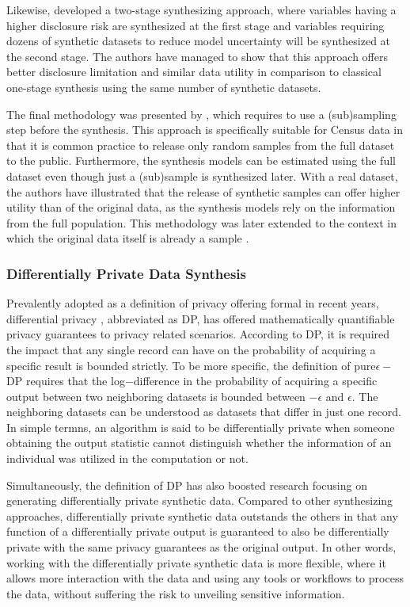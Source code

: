 Likewise, \citet{reiter2010releasing} developed a two-stage synthesizing approach, where variables having a higher disclosure risk are synthesized at the first stage and variables requiring dozens of synthetic datasets to reduce model uncertainty
will be synthesized at the second stage. The authors have managed to show that this approach offers better disclosure limitation and similar data utility in comparison to classical one-stage synthesis using the same number of synthetic datasets.

The final methodology was presented by \citet{drechsler2010sampling}, which requires to use a (sub)sampling step before the synthesis. This approach is specifically suitable for Census data in that
it is common practice to release only random samples from the full dataset to the public. Furthermore, the synthesis models can be estimated using the full dataset even though just a (sub)sample is synthesized later.
With a real dataset, the authors have illustrated that the release of synthetic samples can offer higher utility than of the original data, as the synthesis models rely on the information from the full population. This methodology was later extended to the 
context in which the original data itself is already a sample \citep{drechsler2012combining}.

\subsubsection{Differentially Private Data Synthesis}
\label{subsubsec:dpds}
Prevalently adopted as a definition of privacy offering formal in recent years, differential privacy \citep{dwork2006calibrating}, abbreviated as DP, has offered mathematically quantifiable privacy guarantees to privacy related scenarios.
According to DP, it is required the impact that any single record can have on the probability of acquiring a specific result is bounded strictly. To be more specific, the definition of pure$\epsilon-$DP requires that the log$-$difference in the probability
of acquiring a specific output between two neighboring datasets is bounded between $-\epsilon$ and $\epsilon$. The neighboring datasets can be understood as datasets that differ in just one record. In simple termns, an algorithm is said to be differentially
private when someone obtaining the output statistic cannot distinguish whether the information of an individual was utilized in the computation or not.

Simultaneously, the definition of DP has also boosted research focusing on generating differentially private synthetic data. Compared to other synthesizing approaches, differentially private synthetic data outstands the others in that any function of a differentially
private output is guaranteed to also be differentially private with the same privacy guarantees as the original output. In other words, working with the differentially private synthetic data is more flexible, where it allows more interaction with the data and using any
tools or workflows to process the data, without suffering the risk to unveiling sensitive information.

